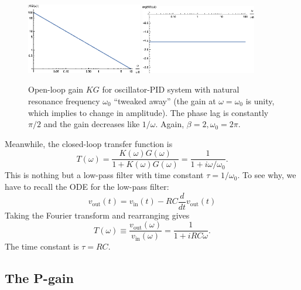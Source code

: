 \documentclass{article}
\theoremstyle{definition}
\newcommand{\f}[2]{\frac{#1}{#2}}
\begin{document}
\begin{figure}[!htb]
	\centering
	\includegraphics[width=0.45\textwidth]{bode_3}
	\quad
	\includegraphics[width=0.45\textwidth]{bode_4}
	\caption{Open-loop gain $KG$ for oscillator-PID system with natural resonance frequency $\omega_0$ ``tweaked away'' (the gain at $\omega = \omega_0$ is unity, which implies to change in amplitude). The phase lag is constantly $\pi/2$ and the gain decreases like $1/\omega$. Again, $\beta = 2,\omega_0 = 2\pi$.} %
	\label{fig:bode_2}
\end{figure}




\noindent Meanwhile, the closed-loop transfer function is 
\begin{equation*}
T(\omega) = \f{K(\omega)G(\omega)}{1+ K(\omega) G(\omega)} = \f{1}{1+ i\omega/\omega_0}.
\end{equation*}
This is nothing but a low-pass filter with time constant $\tau = 1/\omega_0$. To see why, we have to recall the ODE for the low-pass filter: 
\begin{equation*}
v_\text{out}(t) = v_\text{in} (t) - RC \f{d}{dt}v_\text{out}(t)
\end{equation*}
Taking the Fourier transform and rearranging gives
\begin{equation*}
T(\omega) \equiv \f{v_\text{out}(\omega)}{v_\text{in}(\omega)} = \f{1}{1+iRC \omega}.
\end{equation*}
The time constant is $\tau = RC$. 




\subsection{The P-gain}
\end{document}
